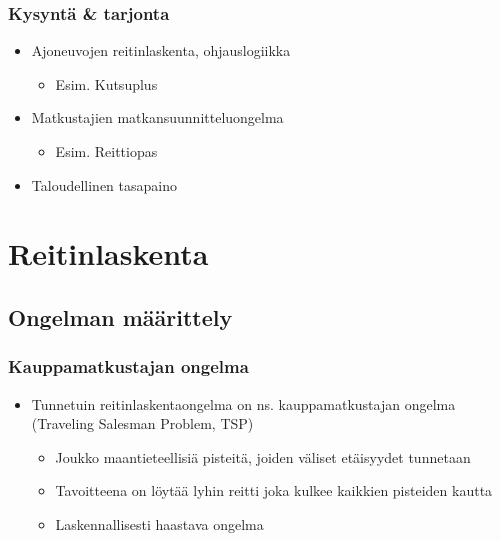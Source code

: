 \documentclass{beamer}
\begin{document}
\begin{frame}
  \frametitle{Kysyntä \& tarjonta}   %
  \begin{itemize}
\item
Ajoneuvojen reitinlaskenta, ohjauslogiikka
\begin{itemize}
\item
Esim. Kutsuplus
\end{itemize}
\item
Matkustajien matkansuunnitteluongelma
\begin{itemize}
\item
Esim. Reittiopas
\end{itemize}
\item
Taloudellinen tasapaino
\end{itemize}


 
\end{frame}

\section{Reitinlaskenta}
\subsection{Ongelman määrittely}
\begin{frame}
  \frametitle{Kauppamatkustajan ongelma}   %
  \begin{itemize}
    \item 
Tunnetuin reitinlaskentaongelma on ns. kauppamatkustajan ongelma (Traveling Salesman Problem, TSP)
\begin{itemize}
\item
Joukko maantieteellisiä pisteitä, joiden väliset etäisyydet tunnetaan
\item
Tavoitteena on löytää lyhin reitti joka kulkee kaikkien pisteiden kautta
\item
Laskennallisesti haastava ongelma
    \end{itemize}
    \end{itemize}
    \end{frame}
\end{document}
